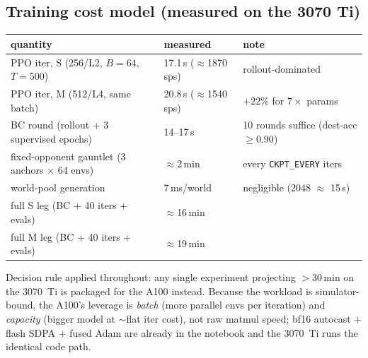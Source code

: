 \documentclass[11pt]{article}
\newcommand{\cd}[1]{\texttt{#1}}
\begin{document}
\subsection{Training cost model (measured on the 3070 Ti)}
\begin{center}\small
\begin{tabular}{@{}lll@{}}
\toprule
quantity & measured & note \\
\midrule
PPO iter, S (256/L2, $B{=}64$, $T{=}500$) & 17.1\,s ($\approx$1870\,sps) & rollout-dominated \\
PPO iter, M (512/L4, same batch)          & 20.8\,s ($\approx$1540\,sps) & $+22\%$ for $7\times$ params \\
BC round (rollout + 3 supervised epochs)  & 14--17\,s & 10 rounds suffice (dest-acc $\ge 0.90$) \\
fixed-opponent gauntlet (3 anchors $\times$ 64 envs) & $\approx$2\,min & every \cd{CKPT\_EVERY} iters \\
world-pool generation                     & 7\,ms/world & negligible (2048 $\approx$ 15\,s) \\
full S leg (BC + 40 iters + evals)        & $\approx$16\,min & \\
full M leg (BC + 40 iters + evals)        & $\approx$19\,min & \\
\bottomrule
\end{tabular}
\end{center}
Decision rule applied throughout: any single experiment projecting $>$30\,min on the 3070~Ti is
packaged for the A100 instead. Because the workload is simulator-bound, the A100's leverage is
\emph{batch} (more parallel envs per iteration) and \emph{capacity} (bigger model at $\sim$flat
iter cost), not raw matmul speed; bf16 autocast + flash SDPA + fused Adam are already in the
notebook and the 3070~Ti runs the identical code path.
\end{document}
